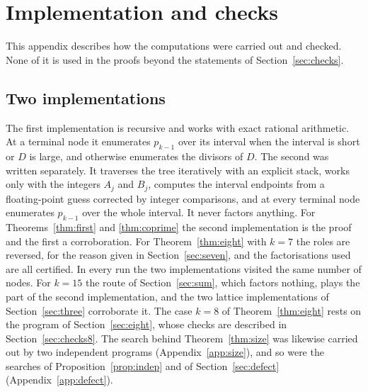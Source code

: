 \documentclass[11pt,reqno]{amsart}
\numberwithin{equation}{section}
\theoremstyle{plain}
\theoremstyle{definition}
\theoremstyle{remark}
\begin{document}
\appendix
\section{Implementation and checks}\label{app:checks}

This appendix describes how the computations were carried out and
checked. None of it is used in the proofs beyond the statements of
Section~\ref{sec:checks}.


\subsection{Two implementations}\label{app:two}
The first implementation is recursive and works with exact rational
arithmetic. At a terminal node it enumerates $p_{k-1}$ over its
interval when the interval is short or $D$ is large, and otherwise
enumerates the divisors of $D$. The second was written separately. It
traverses the tree iteratively with an explicit stack, works only with
the integers $A_j$ and $B_j$, computes the interval endpoints from a
floating-point guess corrected by integer comparisons, and at every
terminal node enumerates $p_{k-1}$ over the whole interval. It never
factors anything. For Theorems~\ref{thm:first} and \ref{thm:coprime}
the second implementation is the proof and the first a corroboration.
For Theorem~\ref{thm:eight} with $k=7$ the roles are reversed, for the
reason given in Section~\ref{sec:seven}, and the factorisations used
are all certified. In every run the two implementations visited the
same number of nodes. For $k=15$ the route of Section~\ref{sec:sum},
which factors nothing, plays the part of the second implementation,
and the two lattice implementations of Section~\ref{sec:three}
corroborate it. The case $k=8$ of Theorem~\ref{thm:eight} rests on
the program of Section~\ref{sec:eight}, whose checks are described in
Section~\ref{sec:checks8}. The search behind Theorem~\ref{thm:size}
was likewise carried out by two independent programs
(Appendix~\ref{app:size}), and so were the searches of
Proposition~\ref{prop:indep} and of Section~\ref{sec:defect}
(Appendix~\ref{app:defect}).
\end{document}
